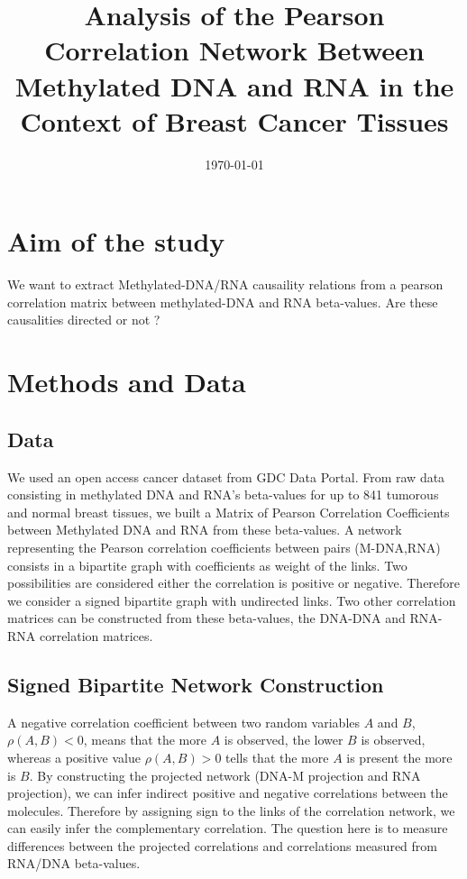 \documentclass[10pt,a4paper]{article}
\title{Analysis of the Pearson Correlation Network Between Methylated DNA and RNA in the Context of Breast Cancer Tissues}
\date{\today}
\begin{document}
\maketitle
\section{Aim of the study}
We want to extract Methylated-DNA/RNA causaility relations from a pearson correlation matrix between methylated-DNA and RNA beta-values. Are these causalities directed or not ?

\section{Methods and Data}
\subsection{Data}
We used an open access cancer dataset from GDC Data Portal. From raw data consisting in methylated DNA and RNA's beta-values for up to 841 tumorous and normal breast tissues, we built a Matrix of Pearson Correlation Coefficients between Methylated DNA and RNA from these beta-values. A network representing the Pearson correlation coefficients between pairs (M-DNA,RNA) consists in a bipartite graph with coefficients as weight of the links. Two possibilities are considered either the correlation is positive or negative. Therefore we consider a signed bipartite graph with undirected links. Two other correlation matrices can be constructed from these beta-values, the DNA-DNA and RNA-RNA correlation matrices.

\subsection{Signed Bipartite Network Construction}
A negative correlation coefficient between two random variables $A$ and $B$, $\rho(A,B)<0$, means that the more $A$ is observed, the lower $B$ is observed, whereas a positive value $\rho(A,B)>0$ tells that the more $A$ is present the more is $B$. By constructing the projected network (DNA-M projection and RNA projection), we can infer indirect positive and negative correlations between the molecules. Therefore by assigning sign to the links of the correlation network, we can easily infer the complementary correlation. The question here is to measure differences between the projected correlations and correlations measured from RNA/DNA beta-values.
\end{document}
